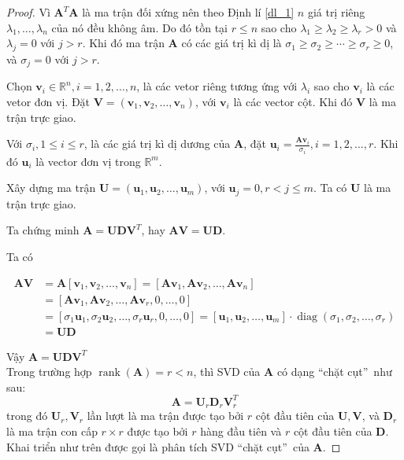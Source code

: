 \documentclass[12pt,a4paper,oneside]{report}
\numberwithin{equation}{section}
\begin{document}
\begin{proof}
Vì $\mathbf{A}^{T} \mathbf{A}$ là ma trận đối xứng nên theo Định lí \ref{dl_1} $n$ giá trị riêng $\lambda_{1}, \ldots, \lambda_{n}$ của nó đều không âm. Do đó tồn tại $r \leqslant n$ sao cho $\lambda_{1} \geqslant \lambda_{2} \geqslant \lambda_{r}>0$ và $\lambda_{j}=0$ với $j>r$. Khi đó ma trận $\mathbf{A}$ có các giá trị kì dị là $\sigma_{1} \geqslant \sigma_{2} \geqslant \cdots \geqslant \sigma_{r} \geqslant 0$, và $\sigma_{j}=0$ với $j>r$.

Chọn $\mathbf{v}_{i} \in \mathbb{R}^{n}, i=1,2, \ldots, n$, là các vetor riêng tương ứng với $\lambda_{i}$ sao cho $\mathbf{v}_{i}$ là các vetor đơn vị. Đặt $\mathbf{V}=\left(\mathbf{v}_{1}, \mathbf{v}_{2}, \ldots, \mathbf{v}_{n}\right)$, với $\mathbf{v}_{i}$ là các vector cột. Khi đó $\mathbf{V}$ là ma trận trực giao.

Với $\sigma_{i}, 1 \leqslant i \leqslant r$, là các giá trị kì dị dương của $\mathbf{A}$, đặt $\mathbf{u}_{i}=\frac{\mathbf{A v}_{i}}{\sigma_{i}}, i=1,2, \ldots, r$. Khi đó $\mathbf{u}_{i}$ là vector đơn vị trong $\mathbb{R}^{m}$.

Xây dựng ma trận $\mathbf{U}=\left(\mathbf{u}_{1}, \mathbf{u}_{2}, \ldots, \mathbf{u}_{m}\right)$, với $\mathbf{u}_{j}=0, r<j \leqslant m$. Ta có $\mathbf{U}$ là ma trận trực giao.

Ta chứng minh $\mathbf{A}=\mathbf{U D V}^{T}$, hay $\mathbf{A V}=\mathbf{U D}$.

Ta có

$$
\begin{aligned}
	\mathbf{A} \mathbf{V} & =\mathbf{A}\left[\mathbf{v}_{1}, \mathbf{v}_{2}, \ldots, \mathbf{v}_{n}\right]=\left[\mathbf{A v}_{1}, \mathbf{A v}_{2}, \ldots, \mathbf{A} \mathbf{v}_{n}\right]\\
	&=\left[\mathbf{A v}_{1}, \mathbf{A v}_{2}, \ldots, \mathbf{A v}_{r}, 0, \ldots, 0\right] \\
	& =\left[\sigma_{1} \mathbf{u}_{1}, \sigma_{2} \mathbf{u}_{2}, \ldots, \sigma_{r} \mathbf{u}_{r}, 0, \ldots, 0\right]=\left[\mathbf{u}_{1}, \mathbf{u}_{2}, \ldots, \mathbf{u}_{m}\right] \cdot \operatorname{diag}\left(\sigma_{1}, \sigma_{2}, \ldots, \sigma_{r}\right) \\
	& =\mathbf{U D}
\end{aligned}
$$

Vậy $\mathbf{A}=\mathbf{U D V}^{T}$\\%
Trong trường hợp $\operatorname{rank}(\mathbf{A})=r<n$, thì SVD của $\mathbf{A}$ có dạng \textquotedblleft chặt cụt\textquotedblright\  như sau:
$$
\mathbf{A}=\mathbf{U}_r \mathbf{D}_r \mathbf{V}_r^T
$$
trong đó $\mathbf{U}_r, \mathbf{V}_r$ lần lượt là ma trận được tạo bởi $r$ cột đầu tiên của $\mathbf{U}, \mathbf{V}$, và $\mathbf{D}_r$ là ma trận con cấp $r \times r$ được tạo bởi $r$ hàng đầu tiên và $r$ cột đầu tiên của $\mathbf{D}$. Khai triển
như trên được gọi là phân tích SVD \textquotedblleft chặt cụt\textquotedblright\  của $\mathbf{A}$.
\end{proof}
\end{document}
